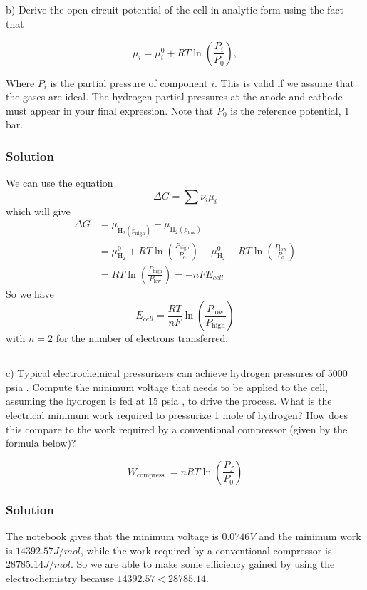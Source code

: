 \documentclass[12pt]{article}
\begin{document}
\subsection{}
b) Derive the open circuit potential of the cell in analytic form using the fact that

$$
\mu_{i}=\mu_{i}^{0}+R T \ln \left(\frac{P_{i}}{P_{0}}\right),
$$

Where $P_{i}$ is the partial pressure of component $i$. This is valid if we assume that the gases are ideal. The hydrogen partial pressures at the anode and cathode must appear in your final expression. Note that $P_{0}$ is the reference potential, 1 bar.\\

\subsubsection{Solution}
We can use the equation
\begin{equation}
    \Delta G = \sum \nu_i \mu_i
\end{equation}
which will give
\begin{align}
    \Delta G &= \mu_{\mathrm{H}_{2}(p_\text{high})} - \mu_{\mathrm{H}_{2}(p_\text{low})} \\
    &= \mu_{\mathrm{H}_{2}}^{0} + RT \ln\left(\frac{P_\text{high}}{P_0}\right) - \mu_{\mathrm{H}_{2}}^{0} - RT \ln\left(\frac{P_\text{low}}{P_0}\right) \\
    &= RT \ln\left(\frac{P_\text{high}}{P_\text{low}}\right) = -nFE_{cell}
\end{align}
So we have
\begin{equation}
    E_{cell} = \frac{RT}{nF} \ln\left(\frac{P_\text{low}}{P_\text{high}}\right)
\end{equation}
with $n=2$ for the number of electrons transferred.
\subsection{}
c) Typical electrochemical pressurizers can achieve hydrogen pressures of 5000 psia . Compute the minimum voltage that needs to be applied to the cell, assuming the hydrogen is fed at 15 psia , to drive the process. What is the electrical minimum work required to pressurize 1 mole of hydrogen? How does this compare to the work required by a conventional compressor (given by the formula below)?

$$
W_{\text {compress }}=n R T \ln \left(\frac{P_{f}}{P_{0}}\right)
$$
\subsubsection{Solution}
The notebook gives that the minimum voltage is $0.0746 V$ and the minimum work is $14392.57 J/mol$, while the work required by a conventional compressor is $28785.14 J/mol$. So we are able to make some efficiency gained by using the electrochemistry because $14392.57 < 28785.14$.
\end{document}
